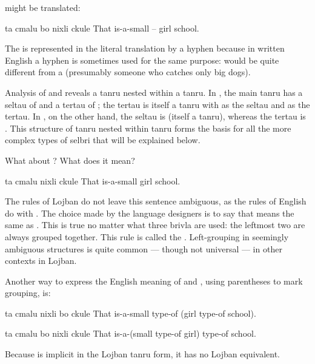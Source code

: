  might be translated:
\begin{example}
ta cmalu bo nixli ckule\n
That is-a-small -- girl school.
\end{example}

The  is represented in the literal translation by a
    hyphen because in written English a hyphen is sometimes used
    for the same purpose:  would be quite
    different from a  (presumably someone who
    catches only big dogs).

Analysis of  and  reveals a tanru nested within a
    tanru. In , the main tanru has a
    seltau of  and a tertau of ; the
    tertau is itself a tanru with  as the seltau and
     as the tertau. In , on
    the other hand, the seltau is  (itself a
    tanru), whereas the tertau is . This structure of
    tanru nested within tanru forms the basis for all the more
    complex types of selbri that will be explained below.

What about ? What does it
    mean?
\begin{example}
ta cmalu nixli ckule\n
That is-a-small girl school.
\end{example}

The rules of Lojban do not leave this sentence ambiguous, as
    the rules of English do with .
    The choice made by the language designers is to say that  means the same as . This is true no matter what three
    brivla are used: the leftmost two are always grouped together.
    This rule is called the . Left-grouping
    in seemingly ambiguous structures is quite common --- though
    not universal --- in other contexts in Lojban. 

Another way to express the English meaning of  and , using parentheses to mark grouping, is:
\begin{example}
ta cmalu nixli bo ckule\n
That is-a-small type-of (girl type-of school).
\end{example}

\begin{example}
ta cmalu bo nixli ckule\n
That is-a-(small type-of girl) type-of school.
\end{example}

Because  is implicit in the Lojban tanru form, it
    has no Lojban equivalent.


